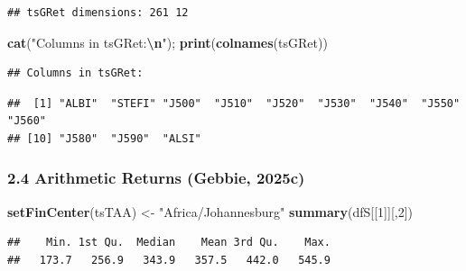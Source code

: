 \documentclass[
  12pt,
]{article}
\newenvironment{Shaded}{\begin{snugshade}}{\end{snugshade}}
\newcommand{\DecValTok}[1]{\textcolor[rgb]{0.00,0.00,0.81}{#1}}
\newcommand{\FunctionTok}[1]{\textcolor[rgb]{0.13,0.29,0.53}{\textbf{#1}}}
\newcommand{\NormalTok}[1]{#1}
\newcommand{\OtherTok}[1]{\textcolor[rgb]{0.56,0.35,0.01}{#1}}
\newcommand{\SpecialCharTok}[1]{\textcolor[rgb]{0.81,0.36,0.00}{\textbf{#1}}}
\newcommand{\StringTok}[1]{\textcolor[rgb]{0.31,0.60,0.02}{#1}}
\begin{document}
\begin{verbatim}
## tsGRet dimensions: 261 12
\end{verbatim}

\begin{Shaded}
\begin{Highlighting}[]
\FunctionTok{cat}\NormalTok{(}\StringTok{"Columns in tsGRet:}\SpecialCharTok{\textbackslash{}n}\StringTok{"}\NormalTok{); }\FunctionTok{print}\NormalTok{(}\FunctionTok{colnames}\NormalTok{(tsGRet))}
\end{Highlighting}
\end{Shaded}

\begin{verbatim}
## Columns in tsGRet:
\end{verbatim}

\begin{verbatim}
##  [1] "ALBI"  "STEFI" "J500"  "J510"  "J520"  "J530"  "J540"  "J550"  "J560" 
## [10] "J580"  "J590"  "ALSI"
\end{verbatim}

\subsubsection{2.4 Arithmetic Returns (Gebbie,
2025c)}\label{arithmetic-returns-tim_btmlx}

\begin{Shaded}
\begin{Highlighting}[]
\FunctionTok{setFinCenter}\NormalTok{(tsTAA) }\OtherTok{\textless{}{-}} \StringTok{"Africa/Johannesburg"}
\FunctionTok{summary}\NormalTok{(dfS[[}\DecValTok{1}\NormalTok{]][,}\DecValTok{2}\NormalTok{])}
\end{Highlighting}
\end{Shaded}

\begin{verbatim}
##    Min. 1st Qu.  Median    Mean 3rd Qu.    Max. 
##   173.7   256.9   343.9   357.5   442.0   545.9
\end{verbatim}
\end{document}
